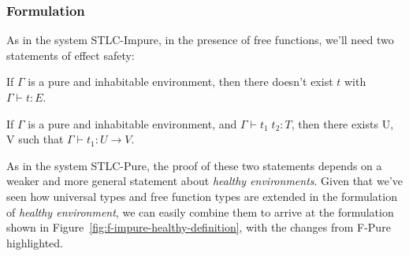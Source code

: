 \subsubsection{Formulation}

As in the system STLC-Impure, in the presence of free functions, we'll
need two statements of effect safety:

\begin{definition}
  If $\Gamma$ is a pure and inhabitable environment, then there
  doesn't exist $t$ with $\Gamma \vdash t : E$.
\end{definition}

\begin{definition}
  If $\Gamma$ is a pure and inhabitable environment, and
  $\Gamma \vdash t_1 \; t_2 : T$, then there exists U, V such that
  $\Gamma \vdash t_1 : U \to V$.
\end{definition}


As in the system STLC-Pure, the proof of these two statements depends
on a weaker and more general statement about \emph{healthy
  environments}. Given that we've seen how universal types and free
function types are extended in the formulation of \emph{healthy
  environment}, we can easily combine them to arrive at the
formulation shown in Figure~\ref{fig:f-impure-healthy-definition},
with the changes from F-Pure highlighted.

